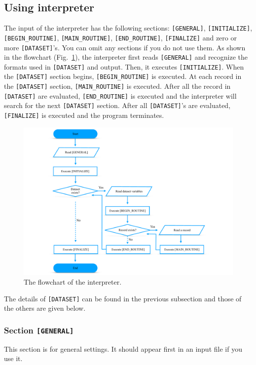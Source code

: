 \documentclass[12pt]{article}
\begin{document}
\subsection{Using interpreter}
The input of the interpreter has the following sections:
\verb|[GENERAL]|, \verb|[INITIALIZE]|, \verb|[BEGIN_ROUTINE]|,
\verb|[MAIN_ROUTINE]|, \verb|[END_ROUTINE]|, \verb|[FINALIZE]| and zero
or more \verb|[DATASET]|'s. You can omit any sections if you do not use
them.  As shown in the flowchart (Fig.~\ref{flow}), the interpreter
first reads
\verb|[GENERAL]| and recognize the formats used in \verb|[DATASET]| and
output. Then, it executes
\verb|[INITIALIZE]|. When the \verb|[DATASET]| section begins, \verb|[BEGIN_ROUTINE]|
is executed. At each record in the \verb|[DATASET]| section,
\verb|[MAIN_ROUTINE]| is executed. After all the record in \verb|[DATASET]|
are evaluated, \verb|[END_ROUTINE]| is executed and the interpreter will
search for the next
\verb|[DATASET]| section. After all \verb|[DATASET]|'s are evaluated,
\verb|[FINALIZE]| is executed and the program terminates.

\begin{figure}[t]
 \begin{center}
  \includegraphics[width=0.8\linewidth]{flowchart.pdf}
 \end{center}
 \caption{The flowchart of the interpreter.}
 \label{flow}
\end{figure}

The details of \verb|[DATASET]| can be found in the previous
subsection and those of the others are given below.
\subsubsection*{Section \tt [GENERAL]}
This section is for general settings. It should appear first in an
input file if you use it. 
\end{document}

